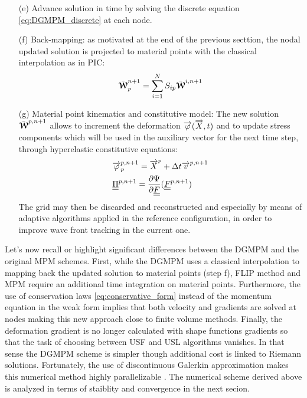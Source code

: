 \begin{itemize}
\item[(e)] Advance solution in time by solving the discrete equation \eqref{eq:DGMPM_discrete} at each node.
\item[(f)] Back-mapping: as motivated at the end of the previous secttion, the nodal updated solution is projected to material points with the classical interpolation as in PIC:
  \begin{equation}
    \bar{{\boldsymbol{\mathcal{W}}}}^{n+1}_p = \sum_{i=1}^{N} S_{ip}\bar{{\boldsymbol{\mathcal{W}}}}^{i,n+1}
  \end{equation}
\item[(g)] Material point kinematics and constitutive model: The new solution $\bar{{\boldsymbol{\mathcal{W}}}}^{p,n+1}$ allows to increment the deformation ${\overrightarrow{\varphi}}({\overrightarrow{X}},t)$ and to update stress components which will be used in the auxiliary vector for the next time step, through hyperelastic constitutive equations:
  \begin{align}
    & {\overrightarrow{\varphi}}^{p,n+1}_p = {\overrightarrow{X}}^p + \Delta t {\overrightarrow{v}}^{p,n+1} \\
    & {\underline{\underline{\Pi}}}^{p,n+1} =  \frac{\partial \Psi}{\partial {\underline{\underline{F}}}}({\underline{\underline{F}}}^{p,n+1})
  \end{align}
  The grid may then be discarded and reconstructed and especially by means of adaptive algorithms applied in the reference configuration, in order to improve wave front tracking in the current one.
\end{itemize}

Let's now recall or highlight significant differences between the DGMPM and the original MPM schemes. 
First, while the DGMPM uses a classical interpolation to mapping back the updated solution to material points (step f), FLIP method and MPM require an additional time integration on material points. 
Furthermore, the use of conservation laws \eqref{eq:conservative_form} instead of the momentum equation in the weak form implies that both velocity and gradients are solved at nodes making this new approach close to finite volume methods. 
Finally, the deformation gradient is no longer calculated with shape functions gradients so that the task of choosing between USF and USL algorithms vanishes. In that sense the DGMPM scheme is simpler though additional cost is linked to Riemann solutions. Fortunately, the use of discontinuous Galerkin approximation makes this numerical method highly parallelizable \cite{Cockburn}. The numerical scheme derived above is analyzed in terms of staiblity and convergence in the next secion.



